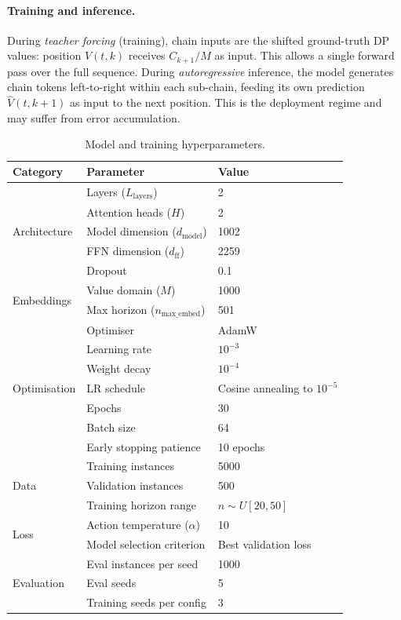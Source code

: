 \paragraph{Training and inference.}
During \emph{teacher forcing} (training), chain inputs are the shifted ground-truth DP values: position $V(t,k)$ receives $C_{k+1}/M$ as input. This allows a single forward pass over the full sequence. During \emph{autoregressive} inference, the model generates chain tokens left-to-right within each sub-chain, feeding its own prediction $\hat{V}(t, k{+}1)$ as input to the next position. This is the deployment regime and may suffer from error accumulation.

\begin{table}[h]
\centering
\caption{Model and training hyperparameters.}
\label{tab:hyperparams}
\small
\begin{tabular}{lll}
\hline
\textbf{Category} & \textbf{Parameter} & \textbf{Value} \\
\hline
\multirow{5}{*}{Architecture}
  & Layers ($L_{\mathrm{layers}}$) & 2 \\
  & Attention heads ($H$) & 2 \\
  & Model dimension ($d_{\mathrm{model}}$) & 1002 \\
  & FFN dimension ($d_{\mathrm{ff}}$) & 2259 \\
  & Dropout & 0.1 \\
\hline
\multirow{2}{*}{Embeddings}
  & Value domain ($M$) & 1000 \\
  & Max horizon ($n_{\mathrm{max\_embed}}$) & 501 \\
\hline
\multirow{7}{*}{Optimisation}
  & Optimiser & AdamW \\
  & Learning rate & $10^{-3}$ \\
  & Weight decay & $10^{-4}$ \\
  & LR schedule & Cosine annealing to $10^{-5}$ \\
  & Epochs & 30 \\
  & Batch size & 64 \\
  & Early stopping patience & 10 epochs \\
\hline
\multirow{3}{*}{Data}
  & Training instances & 5000 \\
  & Validation instances & 500 \\
  & Training horizon range & $n \sim U[20, 50]$ \\
\hline
\multirow{2}{*}{Loss}
  & Action temperature ($\alpha$) & 10 \\
  & Model selection criterion & Best validation loss \\
\hline
\multirow{3}{*}{Evaluation}
  & Eval instances per seed & 1000 \\
  & Eval seeds & 5 \\
  & Training seeds per config & 3 \\
\hline
\end{tabular}
\end{table}

